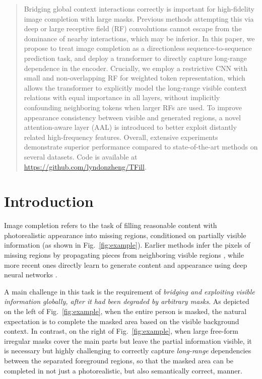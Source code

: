 \documentclass[10pt,twocolumn,letterpaper]{article}
\begin{document}
\maketitle

\begin{abstract}
Bridging global context interactions correctly is important for high-fidelity image completion with large masks. Previous methods attempting this via deep or large receptive field (RF) convolutions cannot escape from the dominance of nearby interactions, which may be inferior. In this paper, we propose to treat image completion as a directionless sequence-to-sequence prediction task, and deploy a transformer to directly capture long-range dependence in the encoder. Crucially, we employ a restrictive CNN with small and non-overlapping RF for weighted token representation, which allows the transformer to explicitly model the long-range visible context relations with equal importance in all layers, without implicitly confounding neighboring tokens when larger RFs are used. To improve appearance consistency between visible and generated regions, a novel attention-aware layer (AAL) is introduced to better exploit distantly related high-frequency features. Overall, extensive experiments demonstrate superior performance compared to state-of-the-art methods on several datasets. Code is available at \href{https://github.com/lyndonzheng/TFill}{https://github.com/lyndonzheng/TFill}. 
\end{abstract}

\section{Introduction}
\label{sec:intro}

Image completion refers to the task of filling reasonable content with photorealistic appearance into missing regions, conditioned on partially visible information (as shown in Fig.\ \ref{fig:example}). Earlier methods infer the pixels of missing regions by propagating pieces from neighboring visible regions \cite{bertalmio2000image,ballester2001filling,criminisi2004region,barnes2009patchmatch}, while more recent ones directly learn to generate content and appearance using deep neural networks \cite{pathak2016context,iizuka2017globally,yu2018generative,Liu_2018_ECCV,Zheng_2019_CVPR,Liu2019MEDFE,Nazeri_2019_ICCV,yi2020contextual,peng2021generating,zeng2021generative,Wan_2021_ICCV}.

A main challenge in this task is the requirement of \emph{bridging and exploiting visible information globally, after it had been degraded by arbitrary masks}. As depicted on the left of Fig.~\ref{fig:example}, when the entire person is masked, the natural expectation is to complete the masked area based on the visible background context. In contrast, on the right of Fig.~\ref{fig:example}, when large free-form irregular masks cover the main parts but leave the partial information visible, it is necessary but highly challenging to correctly capture \emph{long-range} dependencies between the separated foreground regions, so that the masked area can be completed in not just a photorealistic, but also semantically correct, manner.
\end{document}
